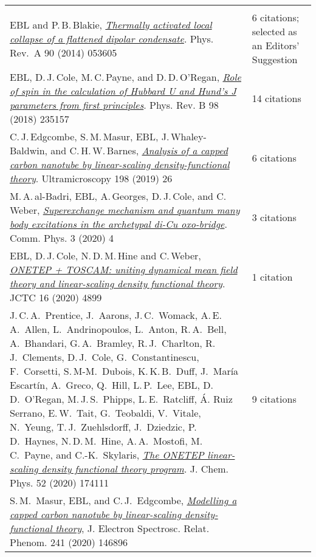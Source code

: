 \documentclass[10pt,a4paper,final]{article}
\begin{document}
\begin{tabularx}{\textwidth}{
m{}%
m{}}
\rowcolor{seaborn_blue}
\multicolumn{2}{l}{\large\textcolor{seaborn_bg_grey_half}{\textbf{Publications}}} \\
EBL and P.\,B.\,Blakie, \href{https://journals.aps.org/pra/pdf/10.1103/PhysRevA.90.053605}{\textit{Thermally activated local collapse of a flattened dipolar condensate}}. Phys. Rev.~A 90 (2014) 053605 & 6 citations; selected as an Editors' Suggestion \\
EBL, D.\,J.\,Cole, M.\,C.\,Payne, and D.\,D.\,O'Regan, \href{https://journals.aps.org/prb/abstract/10.1103/PhysRevB.98.235157}{\textit{Role of spin in the calculation of Hubbard U and Hund’s J parameters from first principles}}. Phys. Rev. B 98 (2018) 235157 & 14 citations \\
C.\,J.\,Edgcombe, S.\,M.\,Masur, EBL, J.\,Whaley-Baldwin, and C.\,H.\,W.\,Barnes, \href{https://www.sciencedirect.com/science/article/pii/S0304399118302833}{\textit{Analysis of a capped carbon nanotube by linear-scaling density-functional theory}}. Ultramicroscopy 198 (2019) 26 & 6 citations \\
M.\,A.\,al-Badri, EBL, A.\,Georges, D.\,J.\,Cole, and C.\,Weber, \href{https://www.nature.com/articles/s42005-019-0270-1}{\textit{Superexchange mechanism and quantum many body excitations in the archetypal di-Cu oxo-bridge}}. Comm. Phys. 3 (2020) 4 & 3 citations \\
EBL, D.\,J.\,Cole, N.\,D.\,M.\,Hine and C.\,Weber, \href{https://pubs.acs.org/doi/10.1021/acs.jctc.0c00162}{\textit{ONETEP + TOSCAM: uniting dynamical mean field theory and linear-scaling density functional theory}}. JCTC 16 (2020) 4899 & 1 citation \\
J.\,C.\,A.\ Prentice, J.\ Aarons, J.\,C.\ Womack, A.\,E.\,A.\ Allen, L.\ Andrinopoulos, L.\ Anton, R.\,A.\ Bell, A.\ Bhandari, G.\,A.\ Bramley, R.\,J.\ Charlton, R.\,J.\ Clements, D.\,J.\ Cole, G.\ Constantinescu, F.\ Corsetti, S.\,M-M.\ Dubois, K.\,K.\,B.\ Duff, J.\ María Escartín, A.\ Greco, Q.\ Hill, L.\,P.\ Lee, EBL, D.\,D.\ O’Regan, M.\,J.\,S.\ Phipps, L.\,E.\ Ratcliff, Á. Ruiz Serrano, E.\,W.\ Tait, G.\ Teobaldi, V.\ Vitale, N.\ Yeung, T.\,J.\ Zuehlsdorff, J.\ Dziedzic, P.\,D.\ Haynes, N.\,D.\,M.\ Hine, A.\,A.\ Mostofi, M.\,C.\ Payne, and C.-K.\ Skylaris, \href{https://aip.scitation.org/doi/full/10.1063/5.0004445}{\textit{The ONETEP linear-scaling density functional theory program}}. J. Chem. Phys. 52 (2020) 174111 & 9 citations \\
S.\,M.\ Masur, EBL, and C.\,J.\ Edgcombe, \href{https://www.sciencedirect.com/science/article/pii/S036820481930221X}{\textit{Modelling a capped carbon nanotube by linear-scaling density-functional theory}}, J. Electron Spectrosc. Relat. Phenom. 241 (2020) 146896 & 
\end{tabularx}
\end{document}
